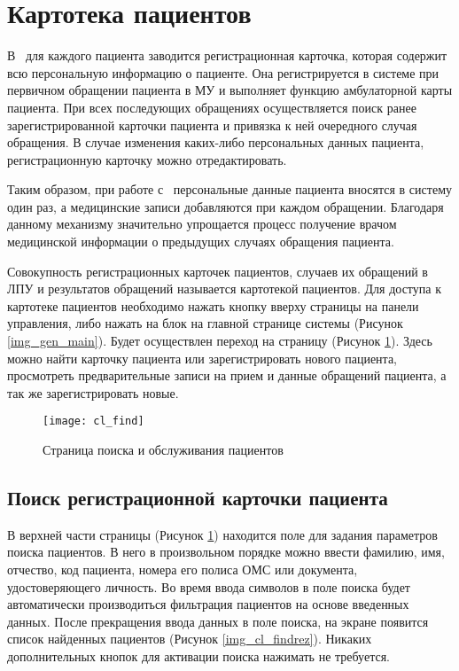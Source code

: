 \newpage
\section{Картотека пациентов}

В \tmis ~для каждого пациента заводится регистрационная карточка, которая содержит всю персональную информацию о пациенте. Она регистрируется в системе при первичном обращении пациента в МУ и выполняет функцию амбулаторной карты пациента. При всех последующих обращениях осуществляется поиск ранее зарегистрированной карточки пациента и привязка к ней очередного случая обращения. В случае изменения каких-либо персональных данных пациента, регистрационную карточку можно отредактировать. 

Таким образом, при работе с \tmis~персональные данные пациента вносятся в систему один раз, а медицинские записи добавляются при каждом обращении. Благодаря данному механизму значительно упрощается процесс получение врачом медицинской информации о предыдущих случаях обращения пациента.

Совокупность регистрационных карточек пациентов, случаев их обращений в ЛПУ и результатов обращений называется картотекой пациентов. Для доступа к картотеке пациентов необходимо нажать кнопку  вверху страницы на панели управления, либо нажать на блок  на главной странице системы (Рисунок \ref{img_gen_main}). Будет осуществлен переход на страницу  (Рисунок \ref{img_cl_find}). Здесь можно найти карточку пациента или зарегистрировать нового пациента, просмотреть предварительные записи на прием и данные обращений пациента, а так же зарегистрировать новые.

\begin{figure}[ht]\centering
 \texttt{[image: cl\_find]}
 \caption{Страница поиска и обслуживания пациентов}
 \label{img_cl_find}
\end{figure} 

\subsection{Поиск регистрационной карточки пациента} \label{cl_find}

В верхней части страницы   (Рисунок \ref{img_cl_find}) находится поле для задания параметров поиска пациентов. В него в произвольном порядке можно ввести фамилию, имя, отчество, код пациента, номера его полиса ОМС или документа, удостоверяющего личность. Во время ввода символов в поле поиска будет автоматически производиться фильтрация пациентов на основе введенных данных. После прекращения ввода данных в поле поиска, на экране появится список найденных пациентов (Рисунок \ref{img_cl_findrez}). Никаких дополнительных кнопок для активации поиска нажимать не требуется.
 

